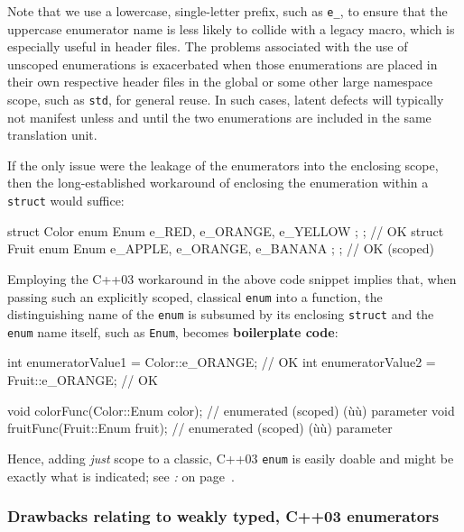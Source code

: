 \noindent Note that
we use a lowercase, single-letter prefix, such as \texttt{e\_}, to
ensure that the uppercase enumerator name is less likely to collide
  with a legacy macro, which is especially useful in header files. The problems associated with the use of unscoped enumerations is
exacerbated when those enumerations are placed in their own respective
header files in the global or some other large namespace scope, such as
\texttt{std}, for general reuse. In such cases, latent defects will
typically not manifest unless and until the two enumerations are
included in the same translation unit.

If the only issue were the leakage of the enumerators into the enclosing
scope, then the long-established workaround of enclosing the enumeration
within a \texttt{struct} would suffice:

\begin{emcppslisting}[emcppsbatch=e1]
struct Color { enum Enum { e_RED, e_ORANGE, e_YELLOW };  };   // OK
struct Fruit { enum Enum { e_APPLE, e_ORANGE, e_BANANA }; };  // OK (scoped)
\end{emcppslisting}

\noindent Employing the C++03 workaround in the above code snippet implies that,
when passing such an explicitly scoped, classical \texttt{enum} into a
function, the distinguishing name of the \texttt{enum} is subsumed by
its enclosing \texttt{struct} and the \texttt{enum} name itself, such as
\texttt{Enum}, becomes \textbf{boilerplate code}:

\begin{emcppslisting}[emcppsbatch=e1]
int enumeratorValue1 = Color::e_ORANGE;  // OK
int enumeratorValue2 = Fruit::e_ORANGE;  // OK

void colorFunc(Color::Enum color);  // enumerated (scoped) (ù{}ù) parameter
void fruitFunc(Fruit::Enum fruit);  // enumerated (scoped) (ù{}ù) parameter
\end{emcppslisting}

\noindent Hence, adding \emph{just} scope to a classic, C++03 \texttt{enum} is
easily doable and might be exactly what is indicated; see
\textit{: } on page~\pageref{strong-typing-of-an-enum-class-can-be-counterproductive}.

\subsubsection[Drawbacks relating to weakly typed, C++03 enumerators]{Drawbacks relating to weakly typed, C++03 enumerators}\label{drawbacks-relating-to-weakly-typed,-c++03-enumerators}

